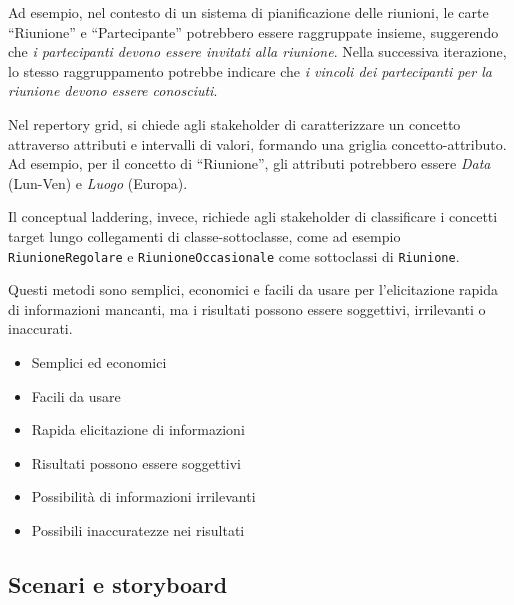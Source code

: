 Ad esempio, nel contesto di un sistema di pianificazione delle riunioni, 
le carte ``Riunione'' e ``Partecipante'' potrebbero essere raggruppate insieme, 
suggerendo che \textit{i partecipanti devono essere invitati alla riunione}. Nella 
successiva iterazione, lo stesso raggruppamento potrebbe indicare che
\textit{i vincoli dei partecipanti per la riunione devono essere conosciuti}.

Nel repertory grid, si chiede agli stakeholder di caratterizzare un concetto
attraverso attributi e intervalli di valori, formando una griglia
concetto-attributo. Ad esempio, per il concetto di ``Riunione'', gli attributi
potrebbero essere \textit{Data} (Lun-Ven) e \textit{Luogo} (Europa).

Il conceptual laddering, invece, richiede agli stakeholder di classificare
i concetti target lungo collegamenti di classe-sottoclasse, come ad esempio
\texttt{RiunioneRegolare} e \texttt{RiunioneOccasionale} come sottoclassi
di \texttt{Riunione}.

Questi metodi sono semplici, economici e facili da usare per l'elicitazione
rapida di informazioni mancanti, ma i risultati possono essere soggettivi,
irrilevanti o inaccurati.

\begin{tcolorbox}[colback=green!5!white,colframe=green!75!black, title=Pro del card sorting e repertory grids]
    \begin{itemize}
        \item Semplici ed economici
        \item Facili da usare
        \item Rapida elicitazione di informazioni
    \end{itemize}
\end{tcolorbox}

\begin{tcolorbox}[colback=red!5!white,colframe=red!75!black, title=Contro del card sorting e repertory grids]
    \begin{itemize}
        \item Risultati possono essere soggettivi
        \item Possibilità di informazioni irrilevanti
        \item Possibili inaccuratezze nei risultati
    \end{itemize}
\end{tcolorbox}

\subsection{Scenari e storyboard}

